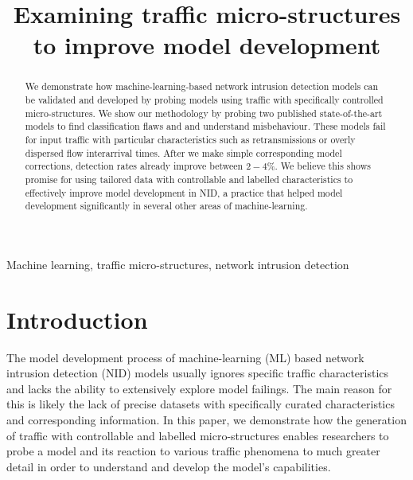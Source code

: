 \documentclass[conference]{IEEEtran}
\begin{document}
 

\title{Examining traffic micro-structures to improve model development}

\maketitle

\begin{abstract}

We demonstrate how machine-learning-based network intrusion detection models can be validated and developed by probing models using traffic with specifically controlled micro-structures. We show our methodology by probing two published state-of-the-art models to find classification flaws and and understand misbehaviour. These models fail for input traffic with particular characteristics such as retransmissions or overly dispersed flow interarrival times. After we make simple corresponding model corrections, detection rates already improve between $2-4\%$.
We believe this shows promise for using tailored data with controllable and labelled characteristics to effectively improve model development in NID, a practice that helped model development significantly in several other areas of machine-learning.

\end{abstract}


\begin{IEEEkeywords}
Machine learning, traffic micro-structures, network intrusion detection
\end{IEEEkeywords} 	



\section{Introduction}

The model development process of machine-learning (ML) based network intrusion detection (NID) models usually ignores specific traffic characteristics and lacks the ability to extensively explore model failings. The main reason for this is likely the lack of precise datasets with specifically curated characteristics and corresponding information. In this paper, we demonstrate how the generation of traffic with controllable and labelled micro-structures enables researchers to probe a model and its reaction to various traffic phenomena to much greater detail in order to understand and develop the model's capabilities.
\end{document}
